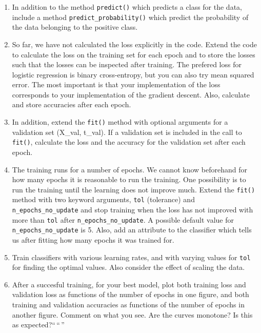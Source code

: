 \documentclass[11pt]{article}
\begin{document}
\begin{enumerate}
\def\labelenumi{\alph{enumi})}
\setcounter{enumi}{1}
\item
  In addition to the method \texttt{predict()} which predicts a class
  for the data, include a method \texttt{predict\_probability()} which
  predict the probability of the data belonging to the positive class.
\item
  So far, we have not calculated the loss explicitly in the code. Extend
  the code to calculate the loss on the training set for each epoch and
  to store the losses such that the losses can be inspected after
  training. The prefered loss for logistic regression is binary
  cross-entropy, but you can also try mean squared error. The most
  important is that your implementation of the loss corresponds to your
  implementation of the gradient descent. Also, calculate and store
  accuracies after each epoch.
\item
  In addition, extend the \texttt{fit()} method with optional arguments
  for a validation set (X\_val, t\_val). If a validation set is included
  in the call to \texttt{fit()}, calculate the loss and the accuracy for
  the validation set after each epoch.
\item
  The training runs for a number of epochs. We cannot know beforehand
  for how many epochs it is reasonable to run the training. One
  possibility is to run the training until the learning does not improve
  much. Extend the \texttt{fit()} method with two keyword arguments,
  \texttt{tol} (tolerance) and \texttt{n\_epochs\_no\_update} and stop
  training when the loss has not improved with more than \texttt{tol}
  after \texttt{n\_epochs\_no\_update}. A possible default value for
  \texttt{n\_epochs\_no\_update} is 5. Also, add an attribute to the
  classifier which tells us after fitting how many epochs it was trained
  for.
\item
  Train classifiers with various learning rates, and with varying values
  for \texttt{tol} for finding the optimal values. Also consider the
  effect of scaling the data.
\item
  After a succesful training, for your best model, plot both training
  loss and validation loss as functions of the number of epochs in one
  figure, and both training and validation accuracies as functions of
  the number of epochs in another figure. Comment on what you see. Are
  the curves monotone? Is this as expected?{}``\,``\,''
\end{enumerate}
\end{document}
